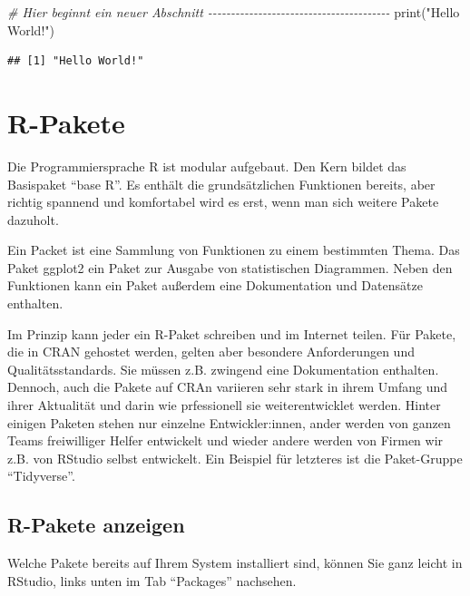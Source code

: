 \documentclass[
]{book}
\newenvironment{Shaded}{\begin{snugshade}}{\end{snugshade}}
\newcommand{\CommentTok}[1]{\textcolor[rgb]{0.56,0.35,0.01}{\textit{#1}}}
\newcommand{\FunctionTok}[1]{\textcolor[rgb]{0.00,0.00,0.00}{#1}}
\newcommand{\NormalTok}[1]{#1}
\newcommand{\StringTok}[1]{\textcolor[rgb]{0.31,0.60,0.02}{#1}}
\begin{document}
\begin{Shaded}
\begin{Highlighting}[]
\CommentTok{\# Hier beginnt ein neuer Abschnitt {-}{-}{-}{-}{-}{-}{-}{-}{-}{-}{-}{-}{-}{-}{-}{-}{-}{-}{-}{-}{-}{-}{-}{-}{-}{-}{-}{-}{-}{-}{-}{-}{-}{-}{-}{-}{-}{-}{-}{-}}
\FunctionTok{print}\NormalTok{(}\StringTok{"Hello World!"}\NormalTok{)}
\end{Highlighting}
\end{Shaded}

\begin{verbatim}
## [1] "Hello World!"
\end{verbatim}

\hypertarget{r-pakete}{%
\section{R-Pakete}\label{r-pakete}}

Die Programmiersprache R ist modular aufgebaut. Den Kern bildet das Basispaket ``base R''. Es enthält die grundsätzlichen Funktionen bereits, aber richtig spannend und komfortabel wird es erst, wenn man sich weitere Pakete dazuholt.

Ein Packet ist eine Sammlung von Funktionen zu einem bestimmten Thema. Das Paket ggplot2 ein Paket zur Ausgabe von statistischen Diagrammen. Neben den Funktionen kann ein Paket außerdem eine Dokumentation und Datensätze enthalten.

Im Prinzip kann jeder ein R-Paket schreiben und im Internet teilen. Für Pakete, die in CRAN gehostet werden, gelten aber besondere Anforderungen und Qualitätsstandards. Sie müssen z.B. zwingend eine Dokumentation enthalten. Dennoch, auch die Pakete auf CRAn variieren sehr stark in ihrem Umfang und ihrer Aktualität und darin wie prfessionell sie weiterentwicklet werden. Hinter einigen Paketen stehen nur einzelne Entwickler:innen, ander werden von ganzen Teams freiwilliger Helfer entwickelt und wieder andere werden von Firmen wir z.B. von RStudio selbst entwickelt. Ein Beispiel für letzteres ist die Paket-Gruppe ``Tidyverse''.

\hypertarget{r-pakete-anzeigen}{%
\subsection{R-Pakete anzeigen}\label{r-pakete-anzeigen}}

Welche Pakete bereits auf Ihrem System installiert sind, können Sie ganz leicht in RStudio, links unten im Tab ``Packages'' nachsehen.
\end{document}
